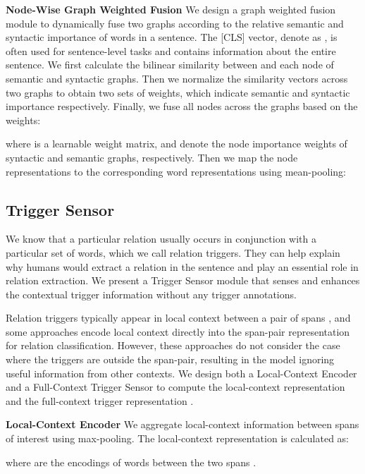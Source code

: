 \documentclass[sigconf]{acmart}
\begin{document}
\noindent\textbf{Node-Wise Graph Weighted Fusion} We design a graph weighted fusion module to dynamically fuse two graphs according to the relative semantic and syntactic importance of words in a sentence. The [CLS] vector, denote as , is often used for sentence-level tasks and contains information about the entire sentence. We first calculate the bilinear similarity between  and each node of semantic and syntactic graphs. Then we normalize the similarity vectors across two graphs to obtain two sets of weights, which indicate semantic and syntactic importance respectively. Finally, we fuse all nodes across the graphs based on the weights:








\noindent where  is a learnable weight matrix,  and  denote the node importance weights of syntactic and semantic graphs, respectively. Then we map the node representations  to the corresponding word representations  using mean-pooling:



\subsection{Trigger Sensor}

We know that a particular relation usually occurs in conjunction with a particular set of words, which we call relation triggers. They can help explain why humans would extract a relation in the sentence and play an essential role in relation extraction. 
We present a Trigger Sensor module that senses and enhances the contextual trigger information without any trigger annotations.

Relation triggers typically appear in local context between a pair of spans , and some approaches encode local context directly into the span-pair representation for relation classification. However, these approaches do not consider the case where the triggers are outside the span-pair, resulting in the model ignoring useful information from other contexts. We design both a Local-Context Encoder and a Full-Context Trigger Sensor to compute the local-context representation  and the full-context trigger representation . 

\noindent\textbf{Local-Context Encoder}
We aggregate local-context information between spans of interest using max-pooling. The local-context representation  is calculated as:


\noindent where  are the encodings of words between the two spans .
\end{document}
